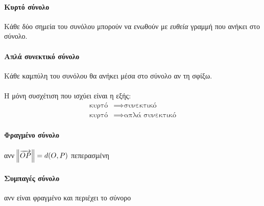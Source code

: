 \documentclass[11pt,a4paper,titlepage,draft]{article}
\begin{document}
\paragraph{Κυρτό σύνολο}
Κάθε δύο σημεία του συνόλου μπορούν να ενωθούν με \textit{ευθεία} γραμμή που ανήκει στο σύνολο.

\paragraph{Απλά συνεκτικό σύνολο}
Κάθε καμπύλη του συνόλου θα ανήκει μέσα στο σύνολο αν τη σφίξω.

\paragraph{}
Η μόνη συσχέτιση που ισχύει είναι η εξής:
\begin{align*}
\text{κυρτό} &\implies \text{συνεκτικό} \\
\text{κυρτό} &\implies \text{απλά συνεκτικό}
\end{align*}


\paragraph{Φραγμένο σύνολο} ανν \(\norm{\overrightarrow{OP}} = d(O,P)\) πεπερασμένη
\paragraph{Συμπαγές σύνολο} ανν είναι φραγμένο και περιέχει το σύνορο
\end{document}
